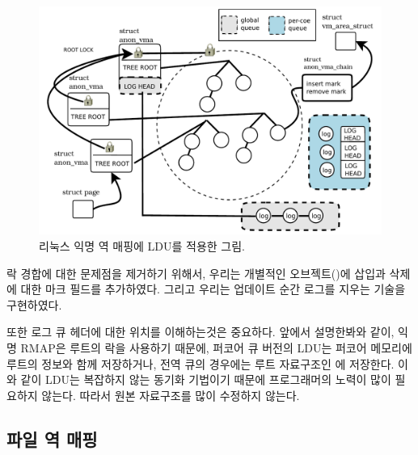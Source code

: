 \begin{figure}[tb]
  \begin{center}
     \includegraphics[width=1\textwidth,height=1\textheight,keepaspectratio]{fig/anon_vma}
  \end{center}
  \caption{리눅스 익명 역 매핑에 LDU를 적용한 그림.}
  \label{fig:anonvmaramp}
\end{figure}

락 경합에 대한 문제점을 제거하기 위해서, 우리는 개별적인 오브젝트()에 
삽입과 삭제에 대한 마크 필드를 추가하였다. 
그리고 우리는 업데이트 순간 로그를 지우는 기술을 구현하였다.

또한 로그 큐 헤더에 대한 위치를 이해하는것은 중요하다.
앞에서 설명한봐와 같이, 익명 RMAP은 루트의 락을 사용하기 때문에, 퍼코어 큐 버전의 LDU는 
퍼코어 메모리에 루트의 정보와 함께 저장하거나, 전역 큐의 경우에는 루트 자료구조인 에 
저장한다. 
이와 같이 LDU는 복잡하지 않는 동기화 기법이기 때문에 프로그래머의 노력이 많이 필요하지 않는다.
따라서 원본 자료구조를 많이 수정하지 않는다. 

\subsection{파일 역 매핑}

